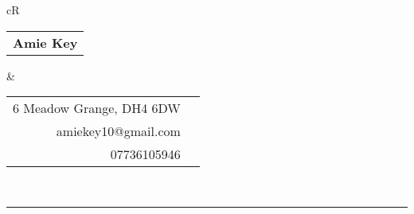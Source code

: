 \documentclass[12pt, a4paper]{article}
\begin{document}
	\noindent
	\begin{tabularx}{\textwidth}{cR}
		\begin{tabular}{l}
			{\HUGE\textbf{Amie Key}} \\
		\end{tabular} & 
	
		\begin{tabular}{rc}
			6 Meadow Grange, DH4 6DW & \faHome\\
			amiekey10@gmail.com & \faEnvelope\\
			07736105946 & \faPhone \\
		\end{tabular} \\
	\end{tabularx}

	\par\noindent\rule{\textwidth}{0.2pt}
\end{document}
